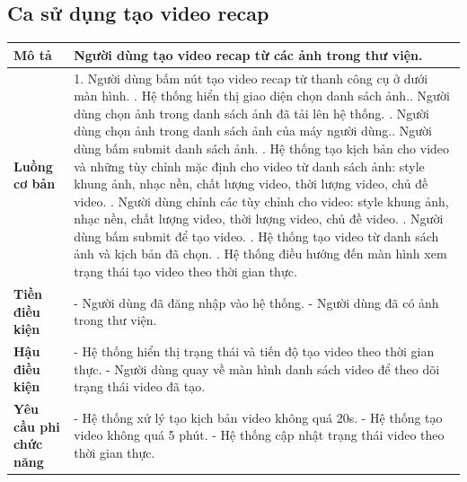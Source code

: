 \subsection{Ca sử dụng tạo video recap}

\vspace{0.2cm}

\noindent 
\begin{tabularx}{\linewidth}{| l | X |} 
\hline 
\textbf{Mô tả} & Người dùng tạo video recap từ các ảnh trong thư viện. \\
\hline 
\textbf{Luồng cơ bản} & 1. Người dùng bấm nút tạo video recap từ thanh công cụ ở dưới màn hình. \newline
                       2. Hệ thống hiển thị giao diện chọn danh sách ảnh.\newline
                       3. Người dùng chọn ảnh trong danh sách ảnh đã tải lên hệ thống. \newline
                       4. Người dùng chọn ảnh trong danh sách ảnh của máy người dùng.\newline
                       5. Người dùng bấm submit danh sách ảnh. \newline
                       6. Hệ thống tạo kịch bản cho video và những tùy chỉnh mặc định cho video từ danh sách ảnh: style khung ảnh, nhạc nền, chất lượng video, thời lượng video, chủ đề video. \newline
                       7. Người dùng chỉnh các tùy chỉnh cho video: style khung ảnh, nhạc nền, chất lượng video, thời lượng video, chủ đề video. \newline
                       8. Người dùng bấm submit để tạo video. \newline
                       9. Hệ thống tạo video từ danh sách ảnh và kịch bản đã chọn. \newline
                       10. Hệ thống điều hướng đến màn hình xem trạng thái tạo video theo thời gian thực. \\
\hline 
\textbf{Tiền điều kiện} & - Người dùng đã đăng nhập vào hệ thống. \newline
                            - Người dùng đã có ảnh trong thư viện. \\
\hline
\textbf{Hậu điều kiện} & - Hệ thống hiển thị trạng thái và tiến độ tạo video theo thời gian thực. \newline
                         - Người dùng quay về màn hình danh sách video để theo dõi trạng thái video đã tạo. \\
\hline 
\textbf{Yêu cầu phi chức năng} & - Hệ thống xử lý tạo kịch bản video không quá 20s. \newline 
                                 - Hệ thống tạo video không quá 5 phút. \newline
                                 - Hệ thống cập nhật trạng thái video theo thời gian thực. \\
\hline 
\end{tabularx}

